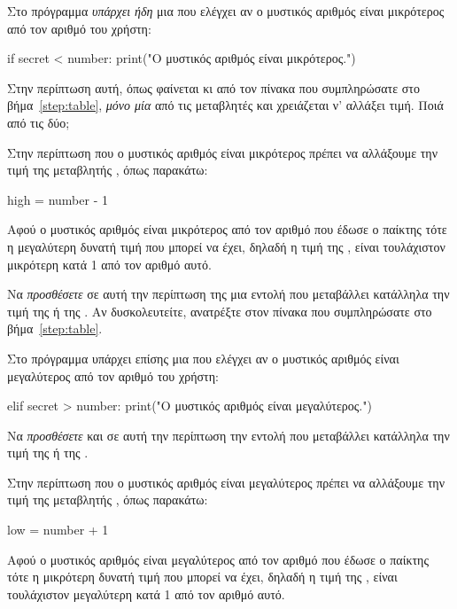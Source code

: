 \documentclass[a4paper,11pt,oneside]{book}
\begin{document}
\begin{step}

Στο πρόγραμμα \emph{υπάρχει ήδη} μια  που ελέγχει αν ο μυστικός αριθμός είναι μικρότερος από τον αριθμό του χρήστη:

\begin{pyplain}
    if secret < number:
        print("Ο μυστικός αριθμός είναι μικρότερος.")
\end{pyplain}

Στην περίπτωση αυτή, όπως φαίνεται κι από τον πίνακα που συμπληρώσατε στο βήμα~\ref{step:table}, \emph{μόνο μία} από τις μεταβλητές  και  χρειάζεται ν' αλλάξει τιμή. Ποιά από τις δύο;

\begin{answer}
Στην περίπτωση που ο μυστικός αριθμός είναι μικρότερος πρέπει να αλλάξουμε την τιμή της μεταβλητής , όπως παρακάτω:

\begin{pynew}
        high = number - 1
\end{pynew}

Αφού ο μυστικός αριθμός είναι μικρότερος από τον αριθμό που έδωσε ο παίκτης τότε η μεγαλύτερη δυνατή τιμή που μπορεί να έχει, δηλαδή η τιμή της , είναι τουλάχιστον μικρότερη κατά 1 από τον αριθμό αυτό. 
\end{answer}

Να \emph{προσθέσετε} σε αυτή την περίπτωση της  μια εντολή που μεταβάλλει κατάλληλα την τιμή της  ή της . Αν δυσκολευτείτε, ανατρέξτε στον πίνακα που συμπληρώσατε στο βήμα~\ref{step:table}.

Στο πρόγραμμα υπάρχει επίσης μια  που ελέγχει αν ο μυστικός αριθμός είναι μεγαλύτερος από τον αριθμό του χρήστη:

\begin{pyplain}
    elif secret > number:
        print("Ο μυστικός αριθμός είναι μεγαλύτερος.")
\end{pyplain}

Να \emph{προσθέσετε} και σε αυτή την περίπτωση την εντολή που μεταβάλλει κατάλληλα την τιμή της  ή της . 

\begin{answer}
	Στην περίπτωση που ο μυστικός αριθμός είναι μεγαλύτερος πρέπει να αλλάξουμε την τιμή της μεταβλητής , όπως παρακάτω:
	
	\begin{pynew}
        low = number + 1
	\end{pynew}

Αφού ο μυστικός αριθμός είναι μεγαλύτερος από τον αριθμό που έδωσε ο παίκτης τότε η μικρότερη δυνατή τιμή που μπορεί να έχει, δηλαδή η τιμή της , είναι τουλάχιστον μεγαλύτερη κατά 1 από τον αριθμό αυτό.
\end{answer}
\end{step}
\end{document}
